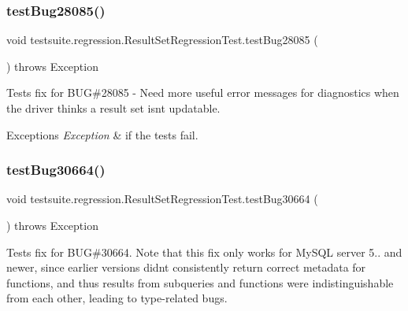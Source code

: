 \mbox{\label{classtestsuite_1_1regression_1_1_result_set_regression_test_a85ca3f94b415a4fd27c69354a16eb5e5}} 
\subsubsection{\texorpdfstring{test\+Bug28085()}{testBug28085()}}
{\footnotesize\ttfamily void testsuite.\+regression.\+Result\+Set\+Regression\+Test.\+test\+Bug28085 (\begin{DoxyParamCaption}{ }\end{DoxyParamCaption}) throws Exception}

Tests fix for B\+UG\#28085 -\/ Need more useful error messages for diagnostics when the driver thinks a result set isn\textquotesingle{}t updatable.


\begin{DoxyExceptions}{Exceptions}
{\em Exception} & if the tests fail. \\
\hline
\end{DoxyExceptions}
\mbox{\label{classtestsuite_1_1regression_1_1_result_set_regression_test_a4a7f176d9e3539b3acd902e97e904e17}} 
\subsubsection{\texorpdfstring{test\+Bug30664()}{testBug30664()}}
{\footnotesize\ttfamily void testsuite.\+regression.\+Result\+Set\+Regression\+Test.\+test\+Bug30664 (\begin{DoxyParamCaption}{ }\end{DoxyParamCaption}) throws Exception}

Tests fix for B\+UG\#30664. Note that this fix only works for My\+S\+QL server 5.. and newer, since earlier versions didn\textquotesingle{}t consistently return correct metadata for functions, and thus results from subqueries and functions were indistinguishable from each other, leading to type-\/related bugs.


